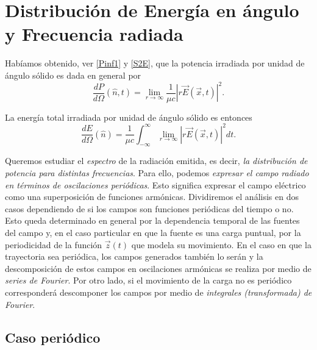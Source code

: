 \section{Distribución de Energía en ángulo y Frecuencia radiada}

Habíamos obtenido, ver \eqref{Pinf1} y \eqref{S2E}, que la potencia irradiada por unidad de ángulo sólido es dada en general por
\begin{equation}\label{dp1}
\frac{dP}{d\Omega}(\hat{n},t)=\lim_{r\to\infty}\frac{1}{\mu c}\left|r\vec{E}(\vec{x},t)\right|^2 .
\end{equation}

La energía total irradiada por unidad de ángulo sólido es entonces
\begin{equation}
\frac{dE}{d\Omega}(\hat{n}) =\frac{1}{\mu c}\int_{-\infty}^{\infty}\lim_{r\to\infty}\left|r\vec{E}(\vec{x},t)\right|^2 dt .
\end{equation}

Queremos estudiar el \textit{espectro} de la radiación emitida, es decir, \textit{la distribución de potencia para distintas frecuencias}. Para ello, podemos \textit{expresar el campo radiado en términos de oscilaciones periódicas}. Esto significa expresar el campo eléctrico como una superposición de funciones armónicas. Dividiremos el análisis en dos casos dependiendo de si los campos son funciones periódicas del tiempo o no. Esto queda determinado en general por la dependencia temporal de las fuentes del campo y, en el caso particular en que la fuente es una carga puntual, por la periodicidad de la función $\vec{z}(t)$ que modela su movimiento. En el caso en que la trayectoria sea periódica, los campos generados también lo serán y la descomposición de estos campos en oscilaciones armónicas se realiza por medio de \textit{series de Fourier}. Por otro lado, si el movimiento de la carga no es periódico corresponderá descomponer los campos por medio de \textit{integrales (transformada) de Fourier}.

\subsection{Caso periódico}\label{sec:rfp}



